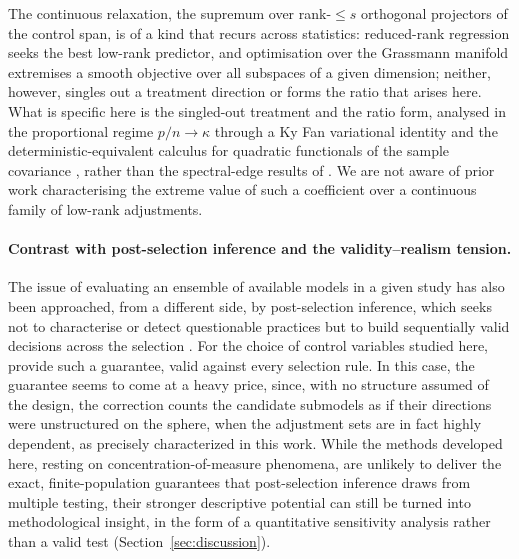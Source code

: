 The continuous relaxation, the supremum over rank-$\le s$ orthogonal projectors of
the control span, is of a kind that recurs across statistics: reduced-rank
regression \citep{izenman1975reduced} seeks the best low-rank predictor, and
optimisation over the Grassmann manifold \citep{edelman1998geometry} extremises a
smooth objective over all subspaces of a given dimension; neither, however,
singles out a treatment direction or forms the ratio that arises here. What is
specific here is the singled-out treatment and the ratio form, analysed in the
proportional regime $p/n\to\kappa$ through a Ky Fan variational identity
\citep{fan1949theorem} and the deterministic-equivalent calculus for quadratic
functionals of the sample covariance \citep{ledoitPeche2011eigenvectors}, rather
than the spectral-edge results of \citet{baiYin1993}. We are not aware of prior
work characterising the extreme value of such a coefficient over a continuous
family of low-rank adjustments.

\paragraph{Contrast with post-selection inference and the validity--realism
tension.} The issue of evaluating an ensemble of available models in a given study
has also been approached, from a different side, by post-selection inference,
which seeks not to characterise or detect questionable practices but to build
sequentially valid decisions across the selection
\citep{cox1975dataSplitting,fithian2014optimal,lee2016exact,tianTaylor2018selective,kuchibhotlaKolassaKuffner2022postSelection}.
For the choice of control variables studied here, \citet{berk2013valid} provide
such a guarantee, valid against every selection rule. In this case, the guarantee
seems to come at a heavy price, since, with no structure assumed of the design,
the correction counts the candidate submodels as if their directions were
unstructured on the sphere, when the adjustment sets are in fact highly dependent, as precisely
characterized in this work. While the methods developed here, resting on concentration-of-measure
phenomena, are unlikely to deliver the exact, finite-population guarantees that
post-selection inference draws from multiple testing, their stronger descriptive 
potential can still be turned into methodological insight, in the form of a quantitative sensitivity analysis
rather than a valid test (Section~\ref{sec:discussion}).